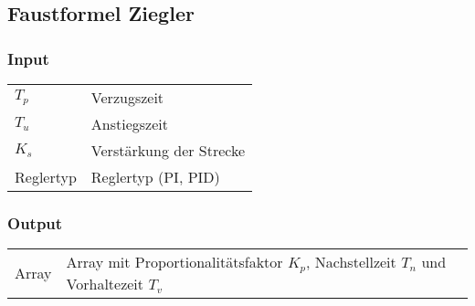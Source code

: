 %


\clearpage
\subsection{Faustformel Ziegler}
\label{app:algo:ziegler}

\subsubsection*{Input}

\begin{tabular}{p{40mm}l}
    $ T_p $        & Verzugszeit \\
    $ T_u $        & Anstiegszeit \\
    $ K_s $        & Verst\"arkung der Strecke \\
      Reglertyp   & Reglertyp (PI, PID)
\end{tabular}

\subsubsection*{Output}
\begin{tabular}{p{40mm}l}
    Array & \parbox[t][4em][s]{0.7\textwidth}{Array mit Proportionalit\"atsfaktor $ K_p $, Nachstellzeit $ T_n $ und Vorhaltezeit $ T_v $}
\end{tabular}

